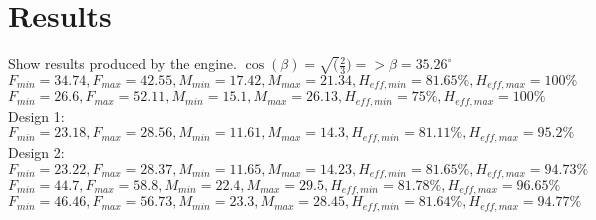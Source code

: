 \chapter{Results}
\label{sec:results}

Show results produced by the engine.
$\cos(\beta) = \sqrt(\frac{2}{3}) =>  \beta = 35.26^{\circ} $ \\
$F_{min} = 34.74, F_{max} = 42.55 , M_{min} = 17.42,  M_{max} = 21.34,  H_{eff,min} = 81.65\%,  H_{eff,max} = 100\%$\\
$F_{min} = 26.6, F_{max} = 52.11 , M_{min} = 15.1,  M_{max} = 26.13,  H_{eff,min} = 75\%,  H_{eff,max} = 100\%$\\
Design 1: $F_{min} = 23.18, F_{max} = 28.56 , M_{min} = 11.61,  M_{max} = 14.3,  H_{eff,min} = 81.11\%,  H_{eff,max} = 95.2\%$\\
Design 2: $F_{min} = 23.22, F_{max} = 28.37 , M_{min} = 11.65,  M_{max} = 14.23,  H_{eff,min} = 81.65\%, H_{eff,max} = 94.73\%$\\
$F_{min} = 44.7, F_{max} = 58.8 , M_{min} = 22.4,  M_{max} = 29.5,  H_{eff,min} = 81.78\%,  H_{eff,max} = 96.65\%$\\
$F_{min} = 46.46, F_{max} = 56.73 , M_{min} = 23.3,  M_{max} = 28.45,  H_{eff,min} = 81.64\%, H_{eff,max} = 94.77\%$\\

